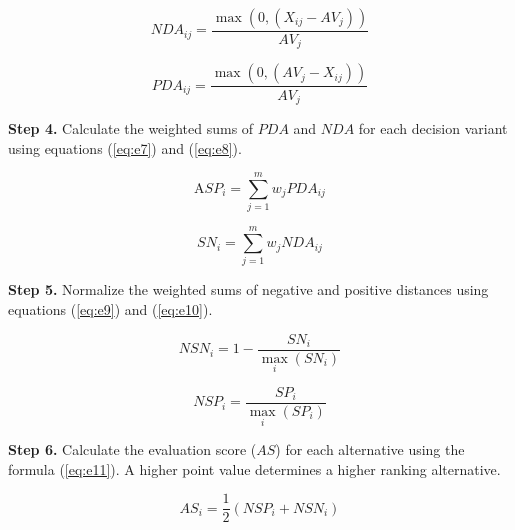 \begin{equation}
N D A_{i j}=\frac{\max \left(0,\left(X_{i j}-A V_{j}\right)\right)}{A V_{j}}
\label{eq:e5}
\end{equation}

\begin{equation}
P D A_{i j}=\frac{\max \left(0,\left(A V_{j}-X_{i j}\right)\right)}{A V_{j}}
\label{eq:e6}
\end{equation}


\noindent \textbf{Step 4.} Calculate the weighted sums of $PDA$ and $NDA$ for each decision variant using equations (\ref{eq:e7}) and (\ref{eq:e8}).

\begin{equation}
\mathrm{A} SP_{i}=\sum_{j=1}^{m} w_{j} P D A_{i j}
\label{eq:e7}
\end{equation}

\begin{equation}
SN_{i}=\sum_{j=1}^{m} w_{j} N D A_{i j}
\label{eq:e8}
\end{equation}


\noindent \textbf{Step 5.} Normalize the weighted sums of negative and positive distances using equations (\ref{eq:e9}) and (\ref{eq:e10}).

\begin{equation}
N S N_{i}=1-\frac{S N_{i}}{\max _{i}\left(S N_{i}\right)}
\label{eq:e9}
\end{equation}

\begin{equation}
N S P_{i}=\frac{S P_{i}}{\max _{i}\left(S P_{i}\right)}
\label{eq:e10}
\end{equation}

\noindent \textbf{Step 6.} Calculate the evaluation score ($AS$) for each alternative using the formula (\ref{eq:e11}). A higher point value determines a higher ranking alternative.

\begin{equation}
A S_{i}=\frac{1}{2}\left(N S P_{i}+N S N_{i}\right)
\label{eq:e11}
\end{equation}